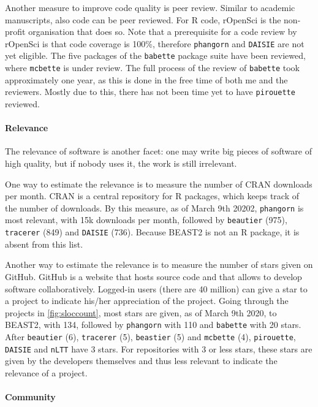 Another measure to improve code quality is peer review. Similar to
academic manuscripts, also code can be peer reviewed. 
For R code, rOpenSci is the non-profit organisation that does so.
Note that a prerequisite for a code review by rOpenSci is that code coverage is 100\%,
therefore \verb;phangorn; and \verb;DAISIE; are not yet eligible.
The five packages of the \verb;babette; package suite have been reviewed, 
where \verb;mcbette; is under review. 
The full process of the review of \verb;babette; took approximately one year,
as this is done in the free time of both me and the reviewers.
Mostly due to this, there has not been time yet to have \verb;pirouette; reviewed.

\paragraph{Relevance}

The relevance of software is another facet: one may write big pieces
of software of high quality, but if nobody uses it, the work is 
still irrelevant.

One way to estimate the relevance is to measure the number of CRAN downloads
per month. CRAN is a central repository for R packages, which keeps
track of the number of downloads. By this measure, as of March 9th 20202,
\verb;phangorn; is most relevant, with 15k downloads per month, followed 
by \verb;beautier; (975), \verb;tracerer; (849) and \verb;DAISIE; (736). Because BEAST2
is not an R package, it is absent from this list.

Another way to estimate the relevance is to measure the number of stars
given on GitHub. GitHub is a website that hosts source code
and that allows to develop software collaboratively.
Logged-in users (there are 40 million) can give a star to a project
to indicate his/her appreciation of the project.
Going through the projects in \ref{fig:sloccount}, most stars
are given, as of March 9th 2020, to BEAST2, with 134, followed
by \verb;phangorn; with 110 and \verb;babette; with 20 stars.
After \verb;beautier; (6), \verb;tracerer; (5), \verb;beastier; (5)
and \verb;mcbette; (4), \verb;pirouette;, \verb;DAISIE; and \verb;nLTT; have 3 stars.
For repositories with 3 or less stars, these stars are given by
the developers themselves and thus less relevant to indicate
the relevance of a project.

\paragraph{Community}

